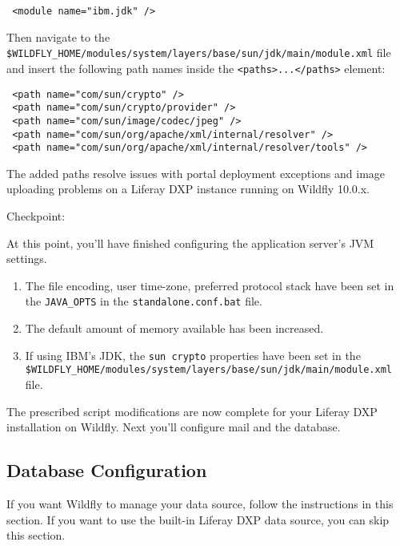 \begin{verbatim}
 <module name="ibm.jdk" />
\end{verbatim}

Then navigate to the
\texttt{\$WILDFLY\_HOME/modules/system/layers/base/sun/jdk/main/module.xml}
file and insert the following path names inside the
\texttt{\textless{}paths\textgreater{}...\textless{}/paths\textgreater{}}
element:

\begin{verbatim}
 <path name="com/sun/crypto" />
 <path name="com/sun/crypto/provider" />
 <path name="com/sun/image/codec/jpeg" />
 <path name="com/sun/org/apache/xml/internal/resolver" />
 <path name="com/sun/org/apache/xml/internal/resolver/tools" />
\end{verbatim}

The added paths resolve issues with portal deployment exceptions and
image uploading problems on a Liferay DXP instance running on Wildfly
10.0.x.

\noindent\hrulefill

Checkpoint:

At this point, you'll have finished configuring the application server's
JVM settings.

\begin{enumerate}
\def\labelenumi{\arabic{enumi}.}
\item
  The file encoding, user time-zone, preferred protocol stack have been
  set in the \texttt{JAVA\_OPTS} in the \texttt{standalone.conf.bat}
  file.
\item
  The default amount of memory available has been increased.
\item
  If using IBM's JDK, the \texttt{sun\ crypto} properties have been set
  in the
  \texttt{\$WILDFLY\_HOME/modules/system/layers/base/sun/jdk/main/module.xml}
  file.
\end{enumerate}

The prescribed script modifications are now complete for your Liferay
DXP installation on Wildfly. Next you'll configure mail and the
database.

\subsection{Database Configuration}\label{database-configuration}

If you want Wildfly to manage your data source, follow the instructions
in this section. If you want to use the built-in Liferay DXP data
source, you can skip this section.


